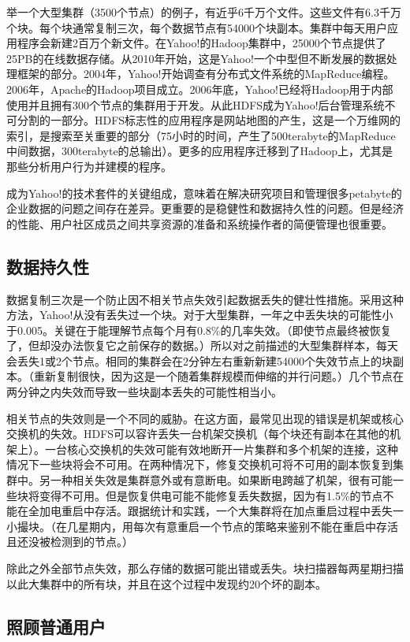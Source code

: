 举一个大型集群（3500个节点）的例子，有近乎6千万个文件。这些文件有6.3千万个块。每个块通常复制三次，每个数据节点有54000个块副本。集群中每天用户应用程序会新建2百万个新文件。在Yahoo!的Hadoop集群中，25000个节点提供了25PB的在线数据存储。从2010年开始，这是Yahoo!一个中型但不断发展的数据处理框架的部分。2004年，Yahoo!开始调查有分布式文件系统的MapReduce编程。2006年，Apache的Hadoop项目成立。2006年底，Yahoo!已经将Hadoop用于内部使用并且拥有300个节点的集群用于开发。从此HDFS成为Yahoo!后台管理系统不可分割的一部分。HDFS标志性的应用程序是网站地图的产生，这是一个万维网的索引，是搜索至关重要的部分（75小时的时间，产生了500terabyte的MapReduce中间数据，300terabyte的总输出）。更多的应用程序迁移到了Hadoop上，尤其是那些分析用户行为并建模的程序。

成为Yahoo!的技术套件的关键组成，意味着在解决研究项目和管理很多petabyte的企业数据的问题之间存在差异。更重要的是稳健性和数据持久性的问题。但是经济的性能、用户社区成员之间共享资源的准备和系统操作者的简便管理也很重要。

\subsection{数据持久性}

数据复制三次是一个防止因不相关节点失效引起数据丢失的健壮性措施。采用这种方法，Yahoo!从没有丢失过一个块。对于大型集群，一年之中丢失块的可能性小于0.005。关键在于能理解节点每个月有0.8\%的几率失效。（即使节点最终被恢复了，但却没办法恢复它之前保存的数据。）所以对之前描述的大型集群样本，每天会丢失1或2个节点。相同的集群会在2分钟左右重新新建54000个失效节点上的块副本。（重新复制很快，因为这是一个随着集群规模而伸缩的并行问题。）几个节点在两分钟之内失效而导致一些块副本丢失的可能性相当小。

相关节点的失效则是一个不同的威胁。在这方面，最常见出现的错误是机架或核心交换机的失效。HDFS可以容许丢失一台机架交换机（每个块还有副本在其他的机架上）。一台核心交换机的失效可能有效地断开一片集群和多个机架的连接，这种情况下一些块将会不可用。在两种情况下，修复交换机可将不可用的副本恢复到集群中。另一种相关失效是集群意外或有意断电。如果断电跨越了机架，很有可能一些块将变得不可用。但是恢复供电可能不能修复丢失数据，因为有1.5\%的节点不能在全加电重启中存活。跟据统计和实践，一个大集群将在加点重启过程中丢失一小撮块。（在几星期内，用每次有意重启一个节点的策略来鉴别不能在重启中存活且还没被检测到的节点。）

除此之外全部节点失效，那么存储的数据可能出错或丢失。块扫描器每两星期扫描以此大集群中的所有块，并且在这个过程中发现约20个坏的副本。

\subsection{照顾普通用户}

